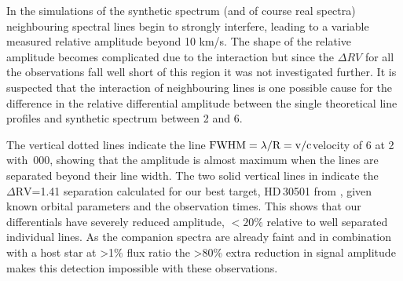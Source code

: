 In the simulations of the synthetic spectrum (and of course real spectra) neighbouring spectral lines begin to strongly interfere, leading to a variable measured relative amplitude beyond 10 km/s. The shape of the relative amplitude becomes complicated due to the interaction but since the \(\Delta {RV}\) for all the observations fall well short of this region it was not investigated further. It is suspected that the interaction of neighbouring lines is one possible cause for the difference in the relative differential amplitude between the single theoretical line profiles and synthetic spectrum between 2 and 6\kmps{}.

The vertical dotted lines indicate the line \(\rm {\textrm{FWHM}} = \lambda /\textrm{R}=v /c \)velocity of 6\kmps{} at 2\um{} with \,000, showing that the amplitude is almost maximum when the lines are separated beyond their line width. The two solid vertical lines in  indicate the \(\Delta \textrm{RV}\)=1.41\kmps{} separation calculated for our best target, {HD\,30501} from , given known orbital parameters and the observation times. This shows that our differentials have severely reduced amplitude, \(<20\%\) relative to well separated individual lines. As the companion spectra are already faint and in combination with a host star at >1\% flux ratio the >80\% extra reduction in signal amplitude makes this detection impossible with these observations.

